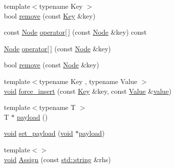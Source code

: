 \begin{DoxyCompactItemize}
\item 
{\footnotesize template$<$typename Key $>$ }\\bool \mbox{\hyperlink{class_y_a_m_l_1_1_node_ab27ee6ca788d596ed47b33d32a47708d}{remove}} (const \mbox{\hyperlink{namespace_y_a_m_l_a67c320aa50d3de7ecba1d0b8775dd684a1af533fc24b0311b8c4d5ac2870283aa}{Key}} \&key)
\item 
const \mbox{\hyperlink{class_y_a_m_l_1_1_node}{Node}} \mbox{\hyperlink{class_y_a_m_l_1_1_node_a61d3f1d940f690d6ba06df7fef53510b}{operator\mbox{[}$\,$\mbox{]}}} (const \mbox{\hyperlink{class_y_a_m_l_1_1_node}{Node}} \&key) const
\item 
\mbox{\hyperlink{class_y_a_m_l_1_1_node}{Node}} \mbox{\hyperlink{class_y_a_m_l_1_1_node_a9f34a4c2a061a93cb49ba81203d27f3c}{operator\mbox{[}$\,$\mbox{]}}} (const \mbox{\hyperlink{class_y_a_m_l_1_1_node}{Node}} \&key)
\item 
bool \mbox{\hyperlink{class_y_a_m_l_1_1_node_ab41bdfe9cb4071e2949f2d0aaeecd00e}{remove}} (const \mbox{\hyperlink{class_y_a_m_l_1_1_node}{Node}} \&key)
\item 
{\footnotesize template$<$typename Key , typename Value $>$ }\\\mbox{\hyperlink{glad_8h_a950fc91edb4504f62f1c577bf4727c29}{void}} \mbox{\hyperlink{class_y_a_m_l_1_1_node_ae5e192ad9ed22a602b1242ccae9486ce}{force\+\_\+insert}} (const \mbox{\hyperlink{namespace_y_a_m_l_a67c320aa50d3de7ecba1d0b8775dd684a1af533fc24b0311b8c4d5ac2870283aa}{Key}} \&key, const \mbox{\hyperlink{namespace_y_a_m_l_a67c320aa50d3de7ecba1d0b8775dd684a0d29a86853d6a9cfe0241ab7ea8da97c}{Value}} \&\mbox{\hyperlink{glad_8h_a03aff08f73d7fde3d1a08e0abd8e84fa}{value}})
\item 
{\footnotesize template$<$typename T $>$ }\\T $\ast$ \mbox{\hyperlink{class_y_a_m_l_1_1_node_a8dd1bef76169bd355c4e80e31d80f9bb}{payload}} ()
\item 
\mbox{\hyperlink{glad_8h_a950fc91edb4504f62f1c577bf4727c29}{void}} \mbox{\hyperlink{class_y_a_m_l_1_1_node_a7afde68585bc7a476435fde6086b4d35}{set\+\_\+payload}} (\mbox{\hyperlink{glad_8h_a950fc91edb4504f62f1c577bf4727c29}{void}} $\ast$\mbox{\hyperlink{class_y_a_m_l_1_1_node_a8dd1bef76169bd355c4e80e31d80f9bb}{payload}})
\item 
{\footnotesize template$<$$>$ }\\\mbox{\hyperlink{glad_8h_a950fc91edb4504f62f1c577bf4727c29}{void}} \mbox{\hyperlink{class_y_a_m_l_1_1_node_aafad8b992bf145dfa4d03df519a41439}{Assign}} (const \mbox{\hyperlink{glad_8h_ac83513893df92266f79a515488701770}{std\+::string}} \&rhs)
\end{DoxyCompactItemize}
